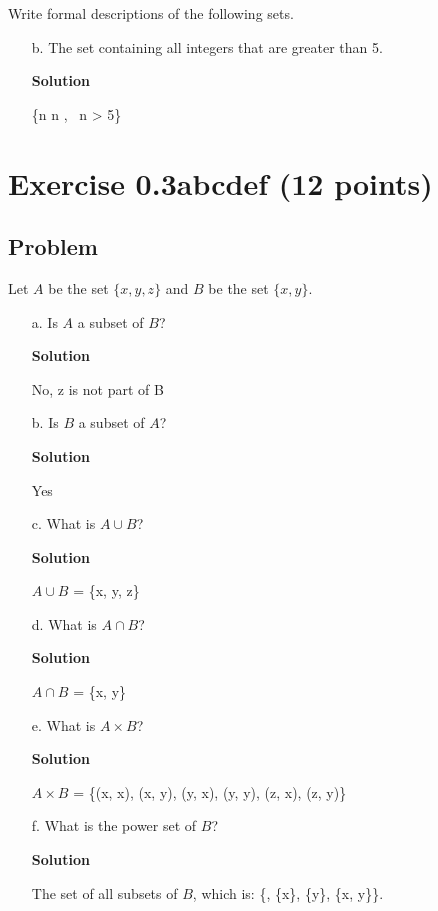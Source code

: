 \documentclass{article}
\begin{document}
\begin{empfile}
Write formal descriptions of the following sets.

\begin{itemize}
\item[b.] The set containing all integers that are greater than 5.

\textbf{Solution}

\{n \mid n \in {}, \, n > 5\}

\end{itemize}

\section*{Exercise 0.3abcdef (12 points)}

\subsection*{Problem}

Let $A$ be the set $\{ x, y, z \}$ and $B$ be the set $\{ x, y \}$.

\begin{itemize}
\item[a.] Is $A$ a subset of $B$?

\textbf{Solution}

No, z is not part of B

\item[b.] Is $B$ a subset of $A$?

\textbf{Solution}

Yes

\item[c.] What is $A \cup B$?

\textbf{Solution}

$A \cup B$ = \{x, y, z\}

\item[d.] What is $A \cap B$?

\textbf{Solution}

$A \cap B$ = \{x, y\}

\item[e.] What is $A \times B$?

\textbf{Solution}

$A \times B$ = \{(x, x), (x, y), (y, x), (y, y), (z, x), (z, y)\}

\item[f.] What is the power set of $B$?

\textbf{Solution}

The set of all subsets of $B$, which is: \{\emptyset, \{x\}, \{y\}, \{x, y\}\}.

\end{itemize}

\end{empfile}
\immediate{}
\end{document}
